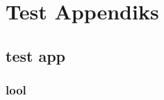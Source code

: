 
\thispagestyle{fancy}
\chapter{Test Appendiks}
\label{app:test_appendiks}

\lipsum

\section{test app}

\lipsum

\subsection{lool}

\lipsum